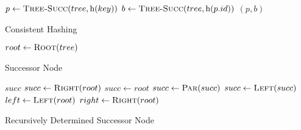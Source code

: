 %
\begin{algorithm}
    \begin{algorithmic}
            \State $p \gets \Call{Tree-Succ}{tree, \func{h}{key}}$
            \State $b \gets \Call{Tree-Succ}{tree, \func{h}{p.id}}$
            \State \Return $(p, b)$
        \EndProcedure
    \end{algorithmic}
    \caption{Consistent Hashing}
    \label{alg:consistent-hashing}
\end{algorithm}
%
\begin{algorithm}
    \begin{algorithmic}
                \State \Return {}
            \Else
                \State $root \gets \Call{Root}{tree}$
                \State \Return {}
            \EndIf
        \EndProcedure
    \end{algorithmic}
    \caption{Successor Node}
    \label{alg:tree-succ}
\end{algorithm}
%
\begin{algorithm}
    \begin{algorithmic}
                \State \Return $succ$
                \State $succ \gets \Call{Right}{root}$
                    \State $succ \gets root$
                        \State $succ \gets \Call{Par}{succ}$
                    \EndWhile
                \Else
                        \State $succ \gets \Call{Left}{succ}$
                    \EndWhile
                \EndIf
                \State $left \gets \Call{Left}{root}$
                \State \Return {}
            \Else
                \State $right \gets \Call{Right}{root}$
                \State \Return {}
            \EndIf
        \EndProcedure
    \end{algorithmic}
    \caption{Recursively Determined Successor Node}
    \label{alg:recur-succ}
\end{algorithm}
%

